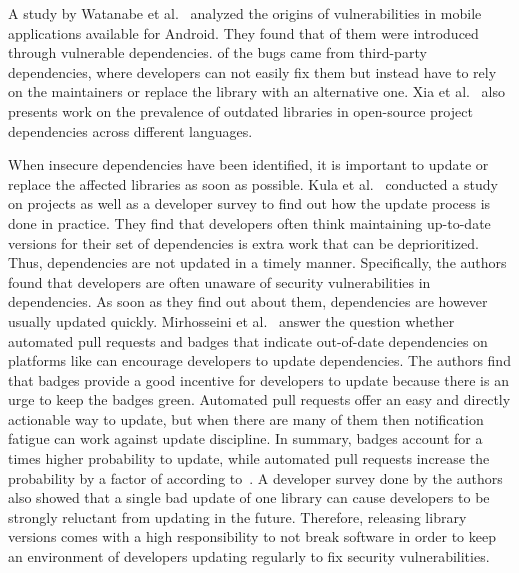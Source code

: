 A study by Watanabe et al.~\cite{watanabe2017} analyzed the origins of vulnerabilities in mobile applications available
for Android.
They found that  of them were introduced through vulnerable dependencies.
 of the bugs came from third-party dependencies, where developers can not easily fix them but instead
have to rely on the maintainers or replace the library with an alternative one.
Xia et al.~\cite{xia2014} also presents work on the prevalence of outdated libraries in open-source project
dependencies across different languages.

When insecure dependencies have been identified, it is important to update or replace the affected libraries as soon as
possible.
Kula et al.~\cite{kula2017} conducted a study on \github{} projects as well as a developer survey to find out how the
update process is done in practice.
They find that developers often think maintaining up-to-date versions for their set of dependencies is extra work that
can be deprioritized.
Thus, dependencies are not updated in a timely manner.
Specifically, the authors found that developers are often unaware of security vulnerabilities in dependencies.
As soon as they find out about them, dependencies are however usually updated quickly.
Mirhosseini et al.~\cite{mirhosseini2017} answer the question whether automated pull requests and badges that indicate
out-of-date dependencies on platforms like \github{} can encourage developers to update dependencies.
The authors find that badges provide a good incentive for developers to update because there is an urge to keep the
badges green.
Automated pull requests offer an easy and directly actionable way to update, but when there are many of them then
notification fatigue can work against update discipline.
In summary, badges account for a  times higher probability to update, while automated pull requests
increase the probability by a factor of  according to~\cite{mirhosseini2017}.
A developer survey done by the authors also showed that a single bad update of one library can cause developers to be
strongly reluctant from updating in the future.
Therefore, releasing library versions comes with a high responsibility to not break software in order to keep an
environment of developers updating regularly to fix security vulnerabilities.
